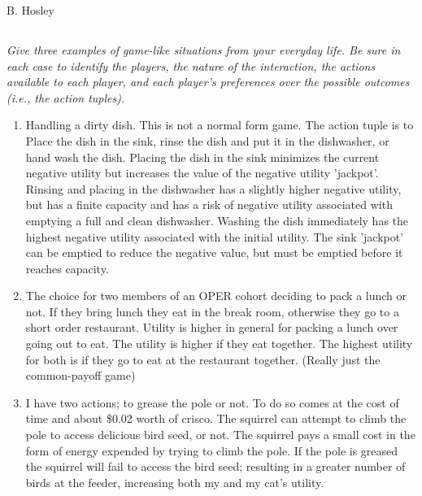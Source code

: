 \documentclass[12pt]{amsart}
\begin{document}
\raggedbottom

\hspace{\fill} {\large B. Hosley}
\bigskip


\subsection{}
\emph{ Give three examples of game-like situations from your everyday life. Be sure in each case to
	identify the players, the nature of the interaction, the actions available to each player, and
	each player’s preferences over the possible outcomes (i.e., the action tuples).}

\begin{enumerate}
	\item 
	Handling a dirty dish. This is not a normal form game. The action tuple is to {Place the dish in the sink, rinse the dish and put it in the dishwasher, or hand wash the dish}. Placing the dish in the sink minimizes the current negative utility but increases the value of the negative utility 'jackpot'. Rinsing and placing in the dishwasher has a slightly higher negative utility, but has a finite capacity and has a risk of negative utility associated with emptying a full and clean dishwasher. Washing the dish immediately has the highest negative utility associated with the initial utility. The sink 'jackpot' can be emptied to reduce the negative value, but must be emptied before it reaches capacity.
	\item 
	The choice for two members of an OPER cohort deciding to pack a lunch or not. 
	If they bring lunch they eat in the break room, otherwise they go to a short order restaurant.
	Utility is higher in general for packing a lunch over going out to eat.
	The utility is higher if they eat together. 
	The highest utility for both is if they go to eat at the restaurant together.
	(Really just the common-payoff game)
	\item 
	I have two actions; to grease the pole or not. 
	To do so comes at the cost of time and about \$0.02 worth of crisco.
	The squirrel can attempt to climb the pole to access delicious bird seed, or not.
	The squirrel pays a small cost in the form of energy expended by trying to climb the pole. 
	If the pole is greased the squirrel will fail to access the bird seed; 
	resulting in a greater number of birds at the feeder, increasing both my and my cat's utility.
\end{enumerate}
\end{document}
